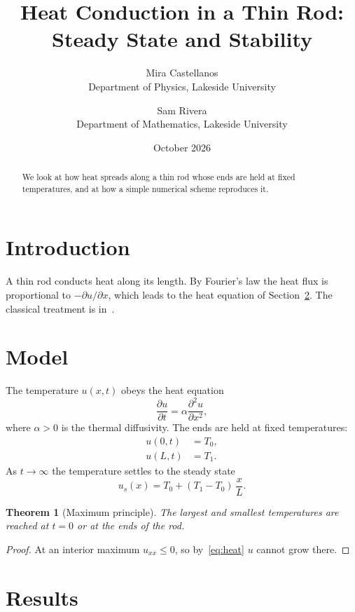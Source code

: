 \documentclass[11pt,a4paper]{article}
\title{Heat Conduction in a Thin Rod: Steady State and Stability}
\author{Mira Castellanos\\ \small Department of Physics, Lakeside University \and Sam Rivera\\ \small Department of Mathematics, Lakeside University}
\date{October 2026}
\newtheorem{theorem}{Theorem}
\begin{document}
\maketitle

\begin{abstract}
We look at how heat spreads along a thin rod whose ends are held at fixed temperatures, and at how a simple numerical scheme reproduces it.
\end{abstract}

\section{Introduction}\label{sec:intro}

A thin rod conducts heat along its length. By Fourier's law the heat flux is proportional to $-\partial u/\partial x$, which leads to the heat equation of Section~\ref{sec:model}. The classical treatment is in~\cite{carslaw1959}.

\section{Model}\label{sec:model}

The temperature $u(x,t)$ obeys the heat equation
\begin{equation}
  \frac{\partial u}{\partial t}=\alpha\frac{\partial^{2}u}{\partial x^{2}},
  \label{eq:heat}
\end{equation}
where $\alpha>0$ is the thermal diffusivity. The ends are held at fixed temperatures:
\begin{align}
  u(0,t) &=T_{0}, \label{eq:bc0} \\
  u(L,t) &=T_{1}. \label{eq:bc1}
\end{align}
As $t\to\infty$ the temperature settles to the steady state
\begin{equation}
  u_{s}(x)=T_{0}+(T_{1}-T_{0})\,\frac{x}{L}.
  \label{eq:4}
\end{equation}

\begin{theorem}[{Maximum principle}]\label{thm:max}
  The largest and smallest temperatures are reached at $t=0$ or at the ends of the rod.
\end{theorem}

\begin{proof}
  At an interior maximum $u_{xx}\leq0$, so by~\eqref{eq:heat} $u$ cannot grow there.
\end{proof}

\section{Results}\label{sec:results}
\end{document}
